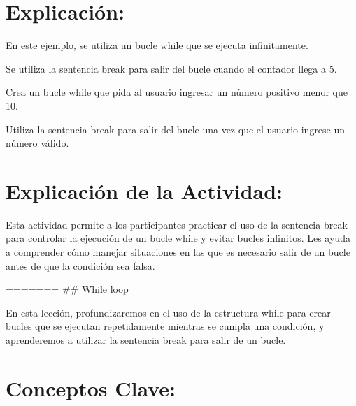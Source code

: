 \documentclass[
  a4paper,
  DIV=11,
  numbers=noendperiod,
  onepage,
  openany]{scrreprt}
\begin{document}
\hypertarget{explicaciuxf3n-38}{%
\section{Explicación:}\label{explicaciuxf3n-38}}

En este ejemplo, se utiliza un bucle while que se ejecuta infinitamente.

Se utiliza la sentencia break para salir del bucle cuando el contador
llega a 5.

\begin{tcolorbox}[enhanced jigsaw, colbacktitle=quarto-callout-important-color!10!white, toprule=.15mm, leftrule=.75mm, titlerule=0mm, opacityback=0, rightrule=.15mm, opacitybacktitle=0.6, breakable, left=2mm, coltitle=black, title=\textcolor{quarto-callout-important-color}{\faExclamation}\hspace{0.5em}{Actividad Práctica:}, toptitle=1mm, bottomtitle=1mm, arc=.35mm, bottomrule=.15mm, colback=white, colframe=quarto-callout-important-color-frame]

Crea un bucle while que pida al usuario ingresar un número positivo
menor que 10.

Utiliza la sentencia break para salir del bucle una vez que el usuario
ingrese un número válido.

\end{tcolorbox}

\hypertarget{explicaciuxf3n-de-la-actividad-36}{%
\section{Explicación de la
Actividad:}\label{explicaciuxf3n-de-la-actividad-36}}

Esta actividad permite a los participantes practicar el uso de la
sentencia break para controlar la ejecución de un bucle while y evitar
bucles infinitos. Les ayuda a comprender cómo manejar situaciones en las
que es necesario salir de un bucle antes de que la condición sea falsa.

======= \#\# While loop

En esta lección, profundizaremos en el uso de la estructura while para
crear bucles que se ejecutan repetidamente mientras se cumpla una
condición, y aprenderemos a utilizar la sentencia break para salir de un
bucle.

\hypertarget{conceptos-clave-39}{%
\section{Conceptos Clave:}\label{conceptos-clave-39}}
\end{document}
